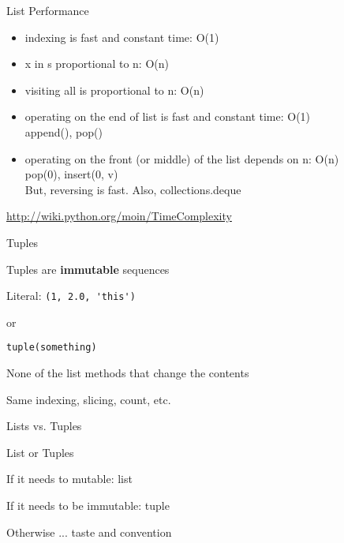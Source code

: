 \documentclass{beamer}
\begin{document}
\begin{frame}[fragile]{List Performance }

\begin{itemize}
  \item indexing is fast and constant time: O(1)
  \item x in s proportional to n: O(n)
  \item visiting all is proportional to n: O(n)
  \item operating on the end of list is fast and constant time: O(1) \\
     append(), pop()
  \item operating on the front (or middle) of the list depends on n: O(n)\\
     pop(0), insert(0, v) \\
     But, reversing is fast. Also, collections.deque
\end{itemize}

\url{ http://wiki.python.org/moin/TimeComplexity}

\end{frame} 

\begin{frame}[fragile]{Tuples}

\vfill
{\Large Tuples are {\bf immutable} sequences}

\vfill
{\Large Literal: \verb|(1, 2.0, 'this')|}

or

{\Large \verb|tuple(something)|}

\vfill
{\Large None of the list methods that change the contents}

\vfill
{\Large Same indexing, slicing, count, etc.}

\end{frame} 



\begin{frame}[fragile]{Lists vs. Tuples}

\vfill
{\Large List or Tuples}

\vfill
{\Large
If it needs to mutable: list

\vfill
If it needs to be immutable: tuple\\
}
\hspace{0.2in}{\large (dict key, safety when passing to a function) }

\vfill
{\Large Otherwise ... taste and convention}

\end{frame} 
\end{document}
